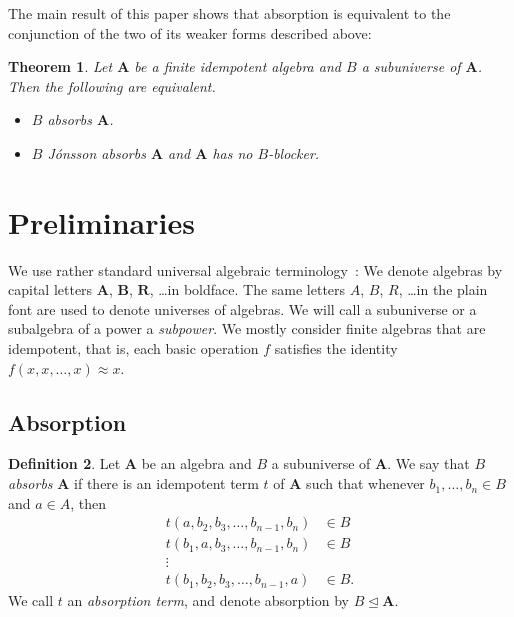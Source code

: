 \documentclass{amsart}
\theoremstyle{plain}
\newtheorem{theorem}{Theorem}
\theoremstyle{definition}
\newtheorem{definition}[theorem]{Definition}
\begin{document}
The main result of this paper shows that absorption is equivalent to the conjunction of the two of its weaker forms described above:

\begin{theorem} \label{MainThm}
Let ${{\mathbf{A}}}$ be a finite idempotent algebra and $B$ a subuniverse of ${{\mathbf{A}}}$. Then the following are equivalent.
\begin{itemize}
\item[(i)] $B$ absorbs ${{\mathbf{A}}}$.
\item[(ii)] $B$ J\'onsson absorbs ${{\mathbf{A}}}$ and ${{\mathbf{A}}}$ has no $B$-blocker.
\end{itemize}
\end{theorem}

\section{Preliminaries}

We use rather standard universal algebraic terminology~\cite{burris,uabook}: We
denote algebras by capital letters ${{\mathbf{A}}}$, ${\mathbf{{B}}}$, ${\mathbf{{R}}}$, \dots in
boldface. The same letters  $A$, $B$, $R$, \dots in the plain font are used to
denote universes of algebras. We will call a subuniverse or a subalgebra of a power a \emph{subpower}. We mostly consider finite algebras that are idempotent, that is, each  basic operation $f$ satisfies the identity $f(x, x, \dots, x) \approx x$. 

\subsection{Absorption}

\begin{definition}
Let ${{\mathbf{A}}}$ be an algebra and $B$ a subuniverse of ${{\mathbf{A}}}$.
We say that $B$ \emph{absorbs} ${{\mathbf{A}}}$ if there is an idempotent term $t$ of ${{\mathbf{A}}}$ such that whenever
$b_1,\dots,b_n\in B$ and $a\in A$, then
\begin{align*}
  t(a,b_2,b_3,\dots,b_{n-1},b_n)&\in B\\
  t(b_1,a,b_3,\dots,b_{n-1},b_n)&\in B\\
  \vdots&\\
  t(b_1,b_2,b_3,\dots,b_{n-1},a)&\in B.
\end{align*}
We call $t$ an \emph{absorption term}, and denote absorption by $B\operatorname{\trianglelefteq} {{\mathbf{A}}}$. 
\end{definition}
\end{document}
